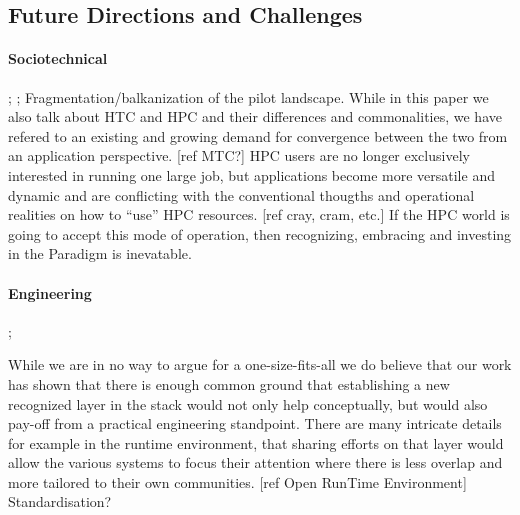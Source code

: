 \documentclass{sig-alternate}
\begin{document}
\subsection{Future Directions and Challenges}
\label{sec:5.3}

\paragraph*{Sociotechnical} ;
; Fragmentation/balkanization of
the pilot landscape.
While in this paper we also talk about HTC and HPC and their differences and
commonalities, we have refered to an existing and growing demand for
convergence between the two from an application perspective.
[ref MTC?]
HPC users are no longer exclusively interested in running one large job, but
applications become more versatile and dynamic and are conflicting with the
conventional thougths and operational realities on how to ``use'' HPC
resources. [ref cray, cram, etc.]
If the HPC world is going to accept this mode of operation, then recognizing,
embracing and investing in the \pilot Paradigm is inevatable.

\paragraph*{Engineering} ; 

While we are in no way to argue for a one-size-fits-all \pilot we do believe
that our work has shown that there is enough common ground that establishing a
new recognized layer in the stack would not only help conceptually, but would
also pay-off from a practical engineering standpoint.
There are many intricate details for example in the runtime environment, that
sharing efforts on that layer would allow the various systems to focus their
attention where there is less overlap and more tailored to their own
communities. [ref Open RunTime Environment] Standardisation?
\end{document}
